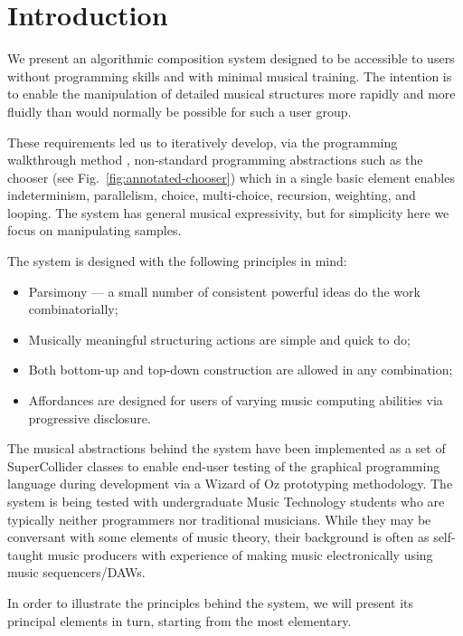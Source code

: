 \documentclass[runningheads,a4paper]{llncs}
\begin{document}
\section{Introduction}\label{introduction}

We present an algorithmic composition system designed to be accessible to users without programming skills and with minimal musical training. The intention is to enable the manipulation of detailed musical structures more rapidly and more fluidly than would normally be possible for such a user group.

These requirements led us to iteratively develop, via the programming walkthrough method \cite{bell}, non-standard programming abstractions such as the chooser (see Fig.~\ref{fig:annotated-chooser}) which in a single basic element enables indeterminism, parallelism, choice, multi-choice, recursion, weighting, and looping. The system has general musical expressivity, but for simplicity here we focus on manipulating samples.

The system is designed with the following principles in mind:

\begin{itemize}
	\item
	Parsimony --- a small number of consistent powerful ideas do the work combinatorially;
	\item
	Musically meaningful structuring actions are simple and quick to do;
	\item
	Both bottom-up and top-down construction are allowed in any combination;
	\item
	Affordances are designed for users of varying music computing abilities via progressive disclosure.
\end{itemize}

The musical abstractions behind the system have been implemented as a set of SuperCollider \cite{supercollider} classes to enable end-user testing of the graphical programming language during development via a Wizard of Oz prototyping methodology. The system is being tested with undergraduate Music Technology students who are typically neither programmers nor traditional musicians. While they may be conversant with some elements of music theory, their background is often as self-taught music producers with experience of making music electronically using music sequencers/DAWs.

In order to illustrate the principles behind the system, we will present its principal elements in turn, starting from the most elementary.
\end{document}
